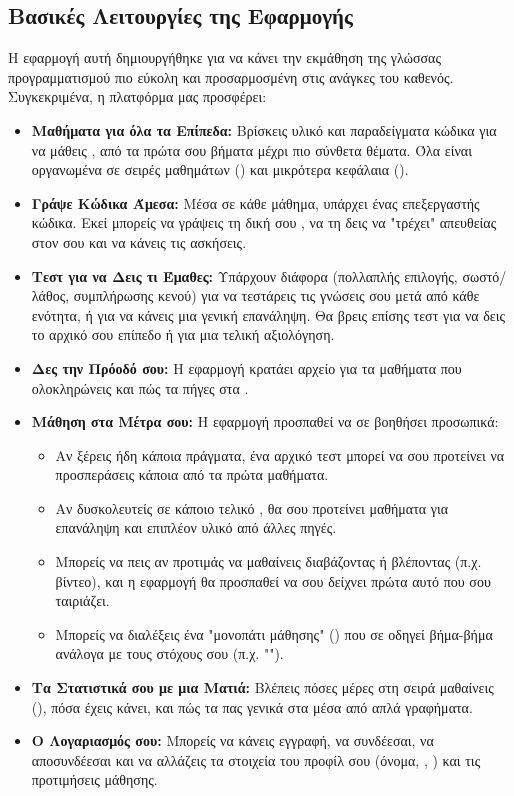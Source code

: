 \subsection{Βασικές Λειτουργίες της Εφαρμογής}
\label{sec:leitourgies_oria}
Η εφαρμογή αυτή δημιουργήθηκε για να κάνει την εκμάθηση της γλώσσας προγραμματισμού  πιο εύκολη και προσαρμοσμένη στις ανάγκες του καθενός. Συγκεκριμένα, η πλατφόρμα μας προσφέρει:
\begin{itemize}[leftmargin=*, noitemsep]
    \item \textbf{Μαθήματα για όλα τα Επίπεδα:} Βρίσκεις υλικό και παραδείγματα κώδικα για να μάθεις , από τα πρώτα σου βήματα μέχρι πιο σύνθετα θέματα. Όλα είναι οργανωμένα σε σειρές μαθημάτων () και μικρότερα κεφάλαια ().
    \item \textbf{Γράψε Κώδικα Άμεσα:} Μέσα σε κάθε μάθημα, υπάρχει ένας επεξεργαστής κώδικα. Εκεί μπορείς να γράψεις τη δική σου , να τη δεις να "τρέχει" απευθείας στον  σου και να κάνεις τις ασκήσεις.
    \item \textbf{Τεστ για να Δεις τι Έμαθες:} Υπάρχουν διάφορα  (πολλαπλής επιλογής, σωστό/λάθος, συμπλήρωσης κενού) για να τεστάρεις τις γνώσεις σου μετά από κάθε ενότητα, ή για να κάνεις μια γενική επανάληψη. Θα βρεις επίσης τεστ για να δεις το αρχικό σου επίπεδο ή για μια τελική αξιολόγηση.
    \item \textbf{Δες την Πρόοδό σου:} Η εφαρμογή κρατάει αρχείο για τα μαθήματα που ολοκληρώνεις και πώς τα πήγες στα .
    \item \textbf{Μάθηση στα Μέτρα σου:} Η εφαρμογή προσπαθεί να σε βοηθήσει προσωπικά:
    \begin{itemize}[leftmargin=*, noitemsep]
        \item Αν ξέρεις ήδη κάποια πράγματα, ένα αρχικό τεστ μπορεί να σου προτείνει να προσπεράσεις κάποια από τα πρώτα μαθήματα.
        \item Αν δυσκολευτείς σε κάποιο τελικό , θα σου προτείνει μαθήματα για επανάληψη και επιπλέον υλικό από άλλες πηγές.
        \item Μπορείς να πεις αν προτιμάς να μαθαίνεις διαβάζοντας ή βλέποντας (π.χ. βίντεο), και η εφαρμογή θα προσπαθεί να σου δείχνει πρώτα αυτό που σου ταιριάζει.
        \item Μπορείς να διαλέξεις ένα "μονοπάτι μάθησης" () που σε οδηγεί βήμα-βήμα ανάλογα με τους στόχους σου (π.χ. "").
    \end{itemize}
    \item \textbf{Τα Στατιστικά σου με μια Ματιά:} Βλέπεις πόσες μέρες στη σειρά μαθαίνεις (), πόσα  έχεις κάνει, και πώς τα πας γενικά στα  μέσα από απλά γραφήματα.
    \item \textbf{Ο Λογαριασμός σου:} Μπορείς να κάνεις εγγραφή, να συνδέεσαι, να αποσυνδέεσαι και να αλλάζεις τα στοιχεία του προφίλ σου (όνομα, , ) και τις προτιμήσεις μάθησης.
\end{itemize}

